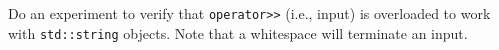 Do an experiment to verify that \texttt{operator>>} (i.e., input) is overloaded to work with \texttt{std::string} objects. Note that a whitespace will terminate an input.

